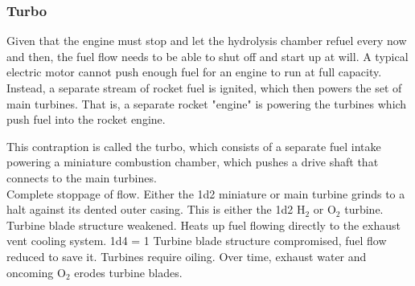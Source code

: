 \documentclass[a4paper]{article}
\begin{document}
%

\vspace{-0.5cm} \hspace{-18pt} \subsubsection{Turbo} \label{engine_turbo} \vspace{-0.2cm}
Given that the engine must stop and let the hydrolysis chamber refuel every now and then, the fuel flow needs to be able to shut off and start up at will. A typical electric motor cannot push enough fuel for an engine to run at full capacity. Instead, a separate stream of rocket fuel is ignited, which then powers the set of main turbines. That is, a separate rocket "engine" is powering the turbines which push fuel into the rocket engine. 

This contraption is called the turbo, which consists of a separate fuel intake powering a miniature combustion chamber, which pushes a drive shaft that connects to the main turbines.
\\ \pbhw
{}
{Complete stoppage of flow. Either the 1d2 miniature or main turbine grinds to a halt against its dented outer casing. This is either the 1d2 H$_2$ or O$_2$ turbine.}
{Turbine blade structure weakened. Heats up fuel flowing directly to the exhaust vent cooling system. \newline 1d4 = 1 Turbine blade structure compromised, fuel flow reduced to save it.}
{Turbines require oiling. Over time, exhaust water and oncoming O$_2$ erodes turbine blades. }
\end{document}
